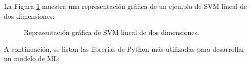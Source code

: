 \begin{itemize}
La  Figura \ref{fig:SVM} muestra una representación gráfica de un ejemplo de \gls{SVM} lineal de dos dimensiones:

\begin{figure}[h!]
\begin{center}
{}
\end{center}
\caption{Representación gráfica de SVM lineal de dos dimensiones.}
\label{fig:SVM}
\end{figure}

\end{itemize}

A continuación, se listan las librerías de Python más utilizadas para desarrollar un modelo de \gls{ML}: 

